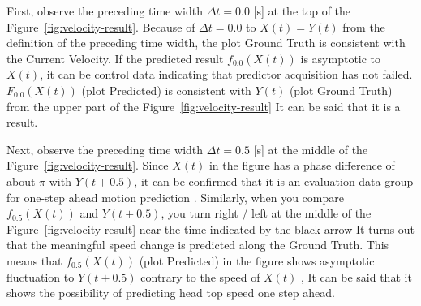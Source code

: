 \documentclass{sigchi}
\begin{document}
First, observe the preceding time width $ \Delta t = 0.0 $ [s] at the top of the Figure~\ref{fig:velocity-result}. Because of $ \Delta t = 0.0 $ to $ X (t) = Y (t) $ from the definition of the preceding time width, the plot Ground Truth is consistent with the Current Velocity. If the predicted result $ f_ {0.0} (X (t)) $ is asymptotic to $ X (t) $, it can be control data indicating that predictor acquisition has not failed. $ F_ {0.0} (X (t)) $ (plot Predicted) is consistent with $ Y (t) $ (plot Ground Truth) from the upper part of the Figure~\ref{fig:velocity-result} It can be said that it is a result.

Next, observe the preceding time width $ \Delta t = 0.5 $ [s] at the middle of the Figure~\ref{fig:velocity-result}. Since $ X (t) $ in the figure has a phase difference of about $ \pi $ with $ Y (t + 0.5) $, it can be confirmed that it is an evaluation data group for one-step ahead motion prediction . Similarly, when you compare $ f_ {0.5} (X (t)) $ and $ Y (t + 0.5) $, you turn right / left at the middle of the Figure~\ref{fig:velocity-result} near the time indicated by the black arrow It turns out that the meaningful speed change is predicted along the Ground Truth. This means that $ f_ {0.5} (X (t)) $ (plot Predicted) in the figure shows asymptotic fluctuation to $ Y (t + 0.5) $ contrary to the speed of $ X (t) $ , It can be said that it shows the possibility of predicting head top speed one step ahead.
\end{document}
